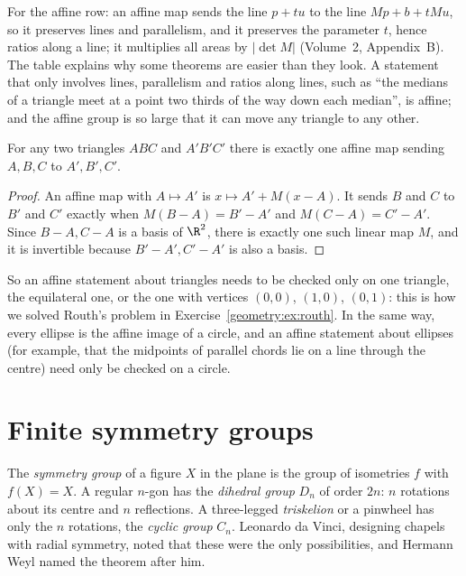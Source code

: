 For the affine row: an affine map sends the line $p+tu$ to the line $Mp+b+tMu$, so it preserves lines and parallelism, and it
preserves the parameter $t$, hence ratios along a line; it multiplies all areas by $|\det M|$ (Volume~2, Appendix~B). The table explains why
some theorems are easier than they look. A statement that only involves lines, parallelism and ratios along lines, such as ``the
medians of a triangle meet at a point two thirds of the way down each median'', is affine; and the affine group is so large that it
can move any triangle to any other.

\begin{proposition}\label{geometry:prop:affinetriangles}
For any two triangles $ABC$ and $A'B'C'$ there is exactly one affine map sending $A,B,C$ to $A',B',C'$.
\end{proposition}
\begin{proof}
An affine map with $A\mapsto A'$ is $x\mapsto A'+M(x-A)$. It sends $B$ and $C$ to $B'$ and $C'$ exactly when $M(B-A)=B'-A'$ and
$M(C-A)=C'-A'$. Since $B-A,C-A$ is a basis of $\R^2$, there is exactly one such linear map $M$, and it is invertible because
$B'-A',C'-A'$ is also a basis.
\end{proof}

So an affine statement about triangles needs to be checked only on one triangle, the equilateral one, or the one with vertices $(0,0)$,
$(1,0)$, $(0,1)$: this is how we solved Routh's problem in Exercise~\ref{geometry:ex:routh}. In the same way, every ellipse is the affine image of a
circle, and an affine statement about ellipses (for example, that the midpoints of parallel chords lie on a line through the centre)
need only be checked on a circle.

\section{Finite symmetry groups}

The \emph{symmetry group} of a figure $X$ in the plane is the group of isometries $f$ with $f(X)=X$. A regular $n$-gon has the
\emph{dihedral group} $D_n$ of order $2n$: $n$ rotations about its centre and $n$ reflections. A three-legged
\emph{triskelion} or a pinwheel has only the $n$ rotations, the \emph{cyclic group} $C_n$. Leonardo da Vinci, designing chapels with
radial symmetry, noted that these were the only possibilities, and Hermann Weyl named the theorem after him.

